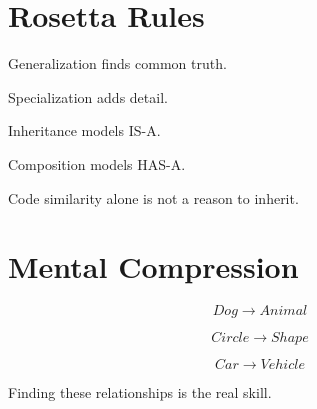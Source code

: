\documentclass[11pt,a4paper]{book}
\begin{document}

\section{Rosetta Rules}

\begin{rosettarule}

Generalization finds common truth.

\end{rosettarule}

\begin{rosettarule}

Specialization adds detail.

\end{rosettarule}

\begin{rosettarule}

Inheritance models IS-A.

\end{rosettarule}

\begin{rosettarule}

Composition models HAS-A.

\end{rosettarule}

\begin{rosettarule}

Code similarity alone is not a reason
to inherit.

\end{rosettarule}


\section{Mental Compression}

\[Dog \rightarrow Animal\]


\[Circle \rightarrow Shape\]


\[Car \rightarrow Vehicle\]


Finding these relationships is the real skill.
\end{document}
